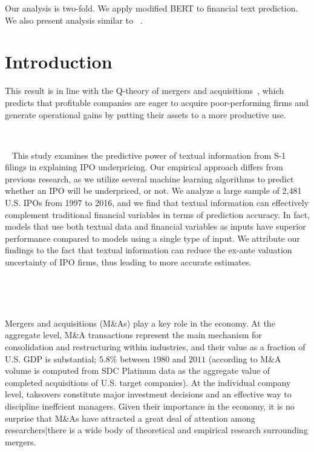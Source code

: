 \documentclass[11pt]{article}
\begin{document}
Our analysis is two-fold. We apply modified BERT to financial text
prediction. We also present analysis similar to ~\cite{moriarty2019}.




\section{Introduction}


This result is in line with the Q-theory of mergers and acquisitions~\cite{jovanovic2002}, which
predicts that profitable companies are eager to acquire poor-performing firms and generate
operational gains by putting their assets to a more productive use.


~\cite{katsafados2019}


~\cite{katsafados2020}
This study examines the predictive power of textual information from S-1 filings in
explaining IPO underpricing. Our empirical approach differs from previous research, as we
utilize several machine learning algorithms to predict whether an IPO will be underpriced, or
not. We analyze a large sample of 2,481 U.S. IPOs from 1997 to 2016, and we find that
textual information can effectively complement traditional financial variables in terms of
prediction accuracy. In fact, models that use both textual data and financial variables as
inputs have superior performance compared to models using a single type of input. We
attribute our findings to the fact that textual information can reduce the ex-ante valuation
uncertainty of IPO firms, thus leading to more accurate estimates.

~\cite{routledge2013}

~\cite{linlin2018}


Mergers and acquisitions (M\&As) play a key role in the economy. At the aggregate level,
M\&A transactions represent the main mechanism for consolidation and restructuring within
industries, and their value as a fraction of U.S. GDP is substantial; $5.8\%$ between $1980$ and
$2011$ (according to M\&A volume is computed from SDC Platinum data as the aggregate value of completed acquisitions of
U.S. target companies). At the individual company level, takeovers constitute major investment decisions and
an effective way to discipline ineffcient managers. Given their importance in the economy, it
is no surprise that M\&As have attracted a great deal of attention among researchers|there
is a wide body of theoretical and empirical research surrounding
mergers.
\end{document}
